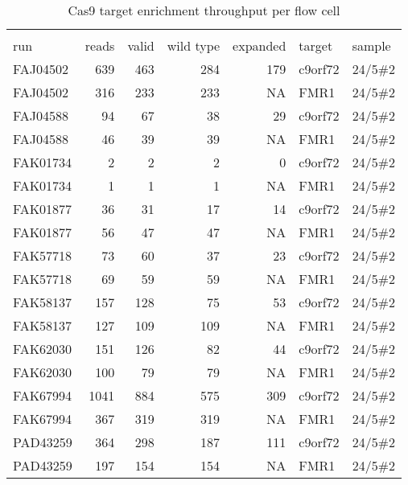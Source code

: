 \setlength\LTleft{0pt}
\setlength\LTright{0pt}
\begin{longtable}{lrrrrll}
\caption[Cas9 target enrichment throughput per flow cell]{Cas9 target enrichment throughput per flow cell} \\
\label{tab:strique:Cas9} \\
run      & reads & valid & wild type & expanded & target  & sample  \\
\hline
FAJ04502 & 639   & 463   & 284       & 179      & c9orf72 & 24/5\#2 \\
FAJ04502 & 316   & 233   & 233       & NA       & FMR1    & 24/5\#2 \\
FAJ04588 & 94    & 67    & 38        & 29       & c9orf72 & 24/5\#2 \\
FAJ04588 & 46    & 39    & 39        & NA       & FMR1    & 24/5\#2 \\
FAK01734 & 2     & 2     & 2         & 0        & c9orf72 & 24/5\#2 \\
FAK01734 & 1     & 1     & 1         & NA       & FMR1    & 24/5\#2 \\
FAK01877 & 36    & 31    & 17        & 14       & c9orf72 & 24/5\#2 \\
FAK01877 & 56    & 47    & 47        & NA       & FMR1    & 24/5\#2 \\
FAK57718 & 73    & 60    & 37        & 23       & c9orf72 & 24/5\#2 \\
FAK57718 & 69    & 59    & 59        & NA       & FMR1    & 24/5\#2 \\
FAK58137 & 157   & 128   & 75        & 53       & c9orf72 & 24/5\#2 \\
FAK58137 & 127   & 109   & 109       & NA       & FMR1    & 24/5\#2 \\
FAK62030 & 151   & 126   & 82        & 44       & c9orf72 & 24/5\#2 \\
FAK62030 & 100   & 79    & 79        & NA       & FMR1    & 24/5\#2 \\
FAK67994 & 1041  & 884   & 575       & 309      & c9orf72 & 24/5\#2 \\
FAK67994 & 367   & 319   & 319       & NA       & FMR1    & 24/5\#2 \\
PAD43259 & 364   & 298   & 187       & 111      & c9orf72 & 24/5\#2 \\
PAD43259 & 197   & 154   & 154       & NA       & FMR1    & 24/5\#2
\end{longtable}

